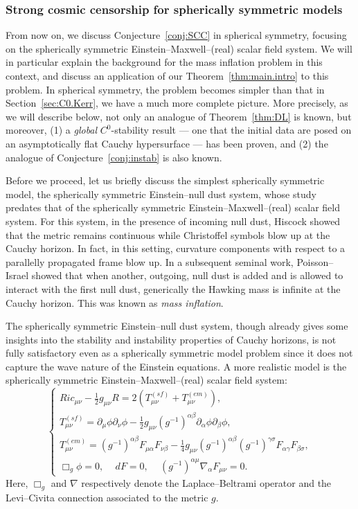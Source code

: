 \documentclass[10pt, reqno]{amsart}
\theoremstyle{definition}
\theoremstyle{remark}
\numberwithin{equation}{section}
\newcommand{\rd}{\partial}
\newcommand{\0}{\emptyset}
\newcommand{\alp}{\alpha}
\newcommand{\bt}{\beta}
\newcommand{\f}{\frac}
\begin{document}
\subsubsection{Strong cosmic censorship for spherically symmetric models}\label{sec:SSModel} From now on, we discuss Conjecture~\ref{conj:SCC} in spherical symmetry, focusing on the spherically symmetric Einstein--Maxwell--(real) scalar field system. We will in particular explain the background for the mass inflation problem in this context, and discuss an application of our Theorem~\ref{thm:main.intro} to this problem. In spherical symmetry, the problem becomes simpler than that in Section~\ref{sec:C0.Kerr}, we have a much more complete picture. More precisely, as we will describe below, not only an analogue of Theorem~\ref{thm:DL} is known, but moreover, (1) a \emph{global} $C^0$-stability result --- one that the initial data are posed on an asymptotically flat Cauchy hypersurface --- has been proven, and (2) the analogue of Conjecture~\ref{conj:instab} is also known.

Before we proceed, let us briefly discuss the simplest spherically symmetric model, the spherically symmetric Einstein--null dust system, whose study predates that of the spherically symmetric Einstein--Maxwell--(real) scalar field system. For this system, in the presence of incoming null dust, Hiscock \cite{Hiscock} showed that the metric remains continuous while Christoffel symbols blow up at the Cauchy horizon. In fact, in this setting, curvature components with respect to a parallelly propagated frame blow up. In a subsequent seminal work, Poisson--Israel \cite{PI1,PI2} showed that when another, outgoing, null dust is added and is allowed to interact with the first null dust, generically the Hawking mass is infinite at the Cauchy horizon. This was known as \emph{mass inflation}.

The spherically symmetric Einstein--null dust system, though already gives some insights into the stability and instability properties of Cauchy horizons, is not fully satisfactory even as a spherically symmetric model problem since it does not capture the wave nature of the Einstein equations. A more realistic model is the spherically symmetric Einstein--Maxwell--(real) scalar field system:
\begin{equation}\label{EMSFS}
\begin{cases}
Ric_{\mu\nu}-\f12 g_{\mu\nu} R=2(T^{(sf)}_{\mu\nu}+T^{(em)}_{\mu\nu}),\\
T^{(sf)}_{\mu\nu}=\rd_\mu\phi\rd_\nu\phi-\f 12 g_{\mu\nu} (g^{-1})^{\alp\beta}\rd_\alp\phi\rd_{\beta}\phi,\\
T^{(em)}_{\mu\nu}=(g^{-1})^{\alp\bt}F_{\mu\alp}F_{\nu\bt}-\f 14 g_{\mu\nu}(g^{-1})^{\alp\bt}(g^{-1})^{\gamma\sigma}F_{\alp\gamma}F_{\bt\sigma},\\
\Box_g\phi=0,\,\quad dF=0,\,\quad (g^{-1})^{\alpha\mu}\nabla_\alpha F_{\mu\nu}=0.
\end{cases}
\end{equation}
Here, $\Box_g$ and $\nabla$ respectively denote the Laplace--Beltrami operator and the Levi--Civita connection associated to the metric $g$.
\end{document}
